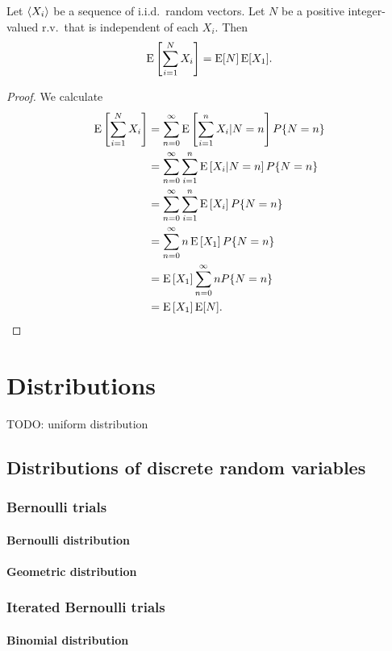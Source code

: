 \begin{proposition}
Let $\left\langle X_i \right\rangle$ be a sequence of i.i.d.\ random vectors. Let $N$ be a positive integer-valued r.v.\ that is independent of each $X_i$. Then
\[ \operatorname{E}\left[\sum_{i = 1}^N X_i\right] = \operatorname{E}[N]\operatorname{E}[X_1]. \]
\end{proposition}
\begin{proof}
We calculate
\begin{align*}
\operatorname{E}\left[\sum_{i = 1}^N X_i\right] &= \sum_{n=0}^{\infty}\operatorname{E}\left[\sum_{i = 1}^n X_i | N = n\right]P\{N = n\} \\
&= \sum_{n=0}^{\infty}\sum_{i = 1}^n \operatorname{E}\left[X_i | N = n\right]P\{N = n\} \\
&= \sum_{n=0}^{\infty}\sum_{i = 1}^n \operatorname{E}\left[X_i\right]P\{N = n\} \\
&= \sum_{n=0}^{\infty} n\operatorname{E}\left[X_1\right]P\{N = n\} \\
&= \operatorname{E}\left[X_1\right]\sum_{n=0}^{\infty} nP\{N = n\} \\
&= \operatorname{E}\left[X_1\right]\operatorname{E}[N].
\end{align*}
\end{proof}

\chapter{Distributions}
TODO: uniform distribution

\section{Distributions of discrete random variables}
\subsection{Bernoulli trials}
\subsubsection{Bernoulli distribution}
\subsubsection{Geometric distribution}

\subsection{Iterated Bernoulli trials}
\subsubsection{Binomial distribution}
